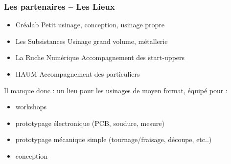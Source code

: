 \documentclass[10pt, compress]{beamer}
\begin{document}
	\begin{frame}
		\frametitle{Les partenaires -- Les Lieux}

		\begin{itemize}
			\item \alert{Créalab} Petit usinage, conception, usinage propre
			\item \alert{Les Subsistances} Usinage grand volume, métallerie
			\item \alert{La Ruche Numérique} Accompagnement des start-uppers
			\item \alert{HAUM} Accompagnement des particuliers
		\end{itemize}

		\pause

		Il manque donc : un lieu pour les usinages de moyen format, équipé pour :

		\pause

		\begin{itemize}[<+->]
			\item \alert{workshops}
			\item \alert{prototypage} électronique (PCB, soudure, mesure)
			\item \alert{prototypage} mécanique simple (tournage/fraisage, découpe, etc..)
			\item \alert{conception}
		\end{itemize}
	\end{frame}
\end{document}
